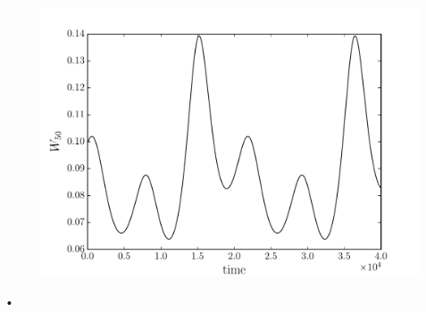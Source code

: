 \documentclass[11pt]{article}
\numberwithin{equation}{section}
\numberwithin{figure}{section}
\numberwithin{table}{section}
\begin{document}
\begin{figure}[ht]
\centering
\includegraphics[width=.5\textwidth]{Pulse_width_modulation}
\caption{}
\label{fig: PulseWidthModulation}
\end{figure}•

	

\end{document}
